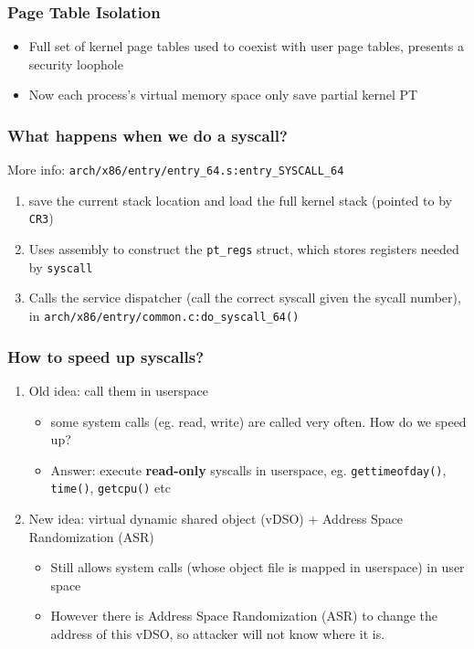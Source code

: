 \documentclass[11pt]{article}
\begin{document}
\subsubsection{Page Table Isolation}
\label{sec:orgad46452}
\begin{itemize}
\item Full set of kernel page tables used to coexist with user page tables, presents
a security loophole
\item Now each process's virtual memory space only save partial kernel PT
\end{itemize}
\subsubsection{What happens when we do a syscall?}
\label{sec:orgbad6e10}
More info: \texttt{arch/x86/entry/entry\_64.s:entry\_SYSCALL\_64}
\begin{enumerate}
\item save the current stack location and load the full kernel stack (pointed to by
\texttt{CR3})
\item Uses assembly to construct the \texttt{pt\_regs} struct, which stores registers
needed by \texttt{syscall}
\item Calls the service dispatcher (call the correct syscall given the sycall
number), in \texttt{arch/x86/entry/common.c:do\_syscall\_64()}
\end{enumerate}
\subsubsection{How to speed up syscalls?}
\label{sec:orgf1642fc}
\begin{enumerate}
\item Old idea: call them in userspace
\label{sec:orgb836ded}
\begin{itemize}
\item some system calls (eg. read, write) are called very often. How do we speed up?
\item Answer: execute \textbf{read-only} syscalls in userspace, eg. \texttt{gettimeofday()},
\texttt{time()}, \texttt{getcpu()} etc
\end{itemize}
\item New idea: virtual dynamic shared object (vDSO) + Address Space Randomization (ASR)
\label{sec:orged6323b}
\begin{itemize}
\item Still allows system calls (whose object file is mapped in userspace) in user space
\item However there is Address Space Randomization (ASR) to change the address of
this vDSO, so attacker will not know where it is.
\end{itemize}
\end{enumerate}
\end{document}
